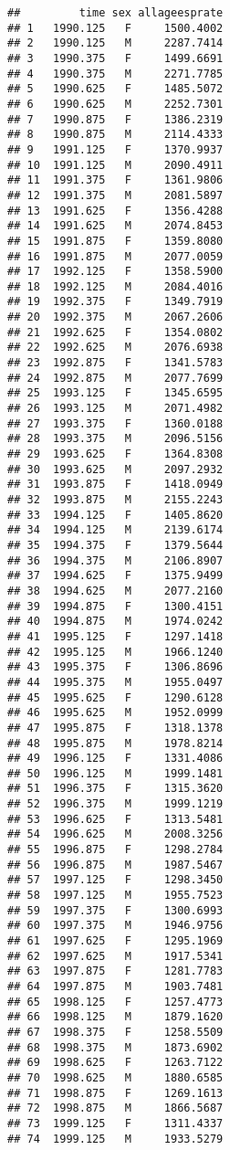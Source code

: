 \documentclass[]{article}
\begin{document}
\begin{verbatim}
##         time sex allageesprate
## 1   1990.125   F     1500.4002
## 2   1990.125   M     2287.7414
## 3   1990.375   F     1499.6691
## 4   1990.375   M     2271.7785
## 5   1990.625   F     1485.5072
## 6   1990.625   M     2252.7301
## 7   1990.875   F     1386.2319
## 8   1990.875   M     2114.4333
## 9   1991.125   F     1370.9937
## 10  1991.125   M     2090.4911
## 11  1991.375   F     1361.9806
## 12  1991.375   M     2081.5897
## 13  1991.625   F     1356.4288
## 14  1991.625   M     2074.8453
## 15  1991.875   F     1359.8080
## 16  1991.875   M     2077.0059
## 17  1992.125   F     1358.5900
## 18  1992.125   M     2084.4016
## 19  1992.375   F     1349.7919
## 20  1992.375   M     2067.2606
## 21  1992.625   F     1354.0802
## 22  1992.625   M     2076.6938
## 23  1992.875   F     1341.5783
## 24  1992.875   M     2077.7699
## 25  1993.125   F     1345.6595
## 26  1993.125   M     2071.4982
## 27  1993.375   F     1360.0188
## 28  1993.375   M     2096.5156
## 29  1993.625   F     1364.8308
## 30  1993.625   M     2097.2932
## 31  1993.875   F     1418.0949
## 32  1993.875   M     2155.2243
## 33  1994.125   F     1405.8620
## 34  1994.125   M     2139.6174
## 35  1994.375   F     1379.5644
## 36  1994.375   M     2106.8907
## 37  1994.625   F     1375.9499
## 38  1994.625   M     2077.2160
## 39  1994.875   F     1300.4151
## 40  1994.875   M     1974.0242
## 41  1995.125   F     1297.1418
## 42  1995.125   M     1966.1240
## 43  1995.375   F     1306.8696
## 44  1995.375   M     1955.0497
## 45  1995.625   F     1290.6128
## 46  1995.625   M     1952.0999
## 47  1995.875   F     1318.1378
## 48  1995.875   M     1978.8214
## 49  1996.125   F     1331.4086
## 50  1996.125   M     1999.1481
## 51  1996.375   F     1315.3620
## 52  1996.375   M     1999.1219
## 53  1996.625   F     1313.5481
## 54  1996.625   M     2008.3256
## 55  1996.875   F     1298.2784
## 56  1996.875   M     1987.5467
## 57  1997.125   F     1298.3450
## 58  1997.125   M     1955.7523
## 59  1997.375   F     1300.6993
## 60  1997.375   M     1946.9756
## 61  1997.625   F     1295.1969
## 62  1997.625   M     1917.5341
## 63  1997.875   F     1281.7783
## 64  1997.875   M     1903.7481
## 65  1998.125   F     1257.4773
## 66  1998.125   M     1879.1620
## 67  1998.375   F     1258.5509
## 68  1998.375   M     1873.6902
## 69  1998.625   F     1263.7122
## 70  1998.625   M     1880.6585
## 71  1998.875   F     1269.1613
## 72  1998.875   M     1866.5687
## 73  1999.125   F     1311.4337
## 74  1999.125   M     1933.5279

\end{verbatim}
\end{document}
